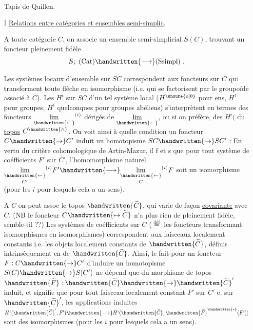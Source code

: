 
Tapis de Quillen.

I \uline{Relations entre catégories et ensembles semi-simplic}.

A toute catégorie $C$, on associe un ensemble semi-simplicial $S(C)$, trouvant  un foncteur pleinement fidèle 
\[
S;\ (\mathrm{Cat})\handwritten{\longrightarrow}(\mathrm{Ssimpl})\ .
\]

 Les systèmes locaux d'ensemble sur $SC$ correspondent aux foncteurs sur $C$ qui transforment toute flêche en isomorphisme (i.e. qui se factorisent par le groupoïde associé à $C$). Les $H^i$ sur $SC$ d'un tel système local ($H^{\unsure{o|0}}$ pour ens, $H^1$ pour groupes, $H^i$ quelconques pour groupes abéliens) s'interprètent en termes des foncteurs $\underset{\handwritten{\leftarrow}}{\mathrm{lim}}^{(i)}$ dérigés de $\underset{\handwritten{\leftarrow}}{\mathrm{lim}}$, ou si on préfère, des $H^i($ du \uline{topos} $C^{\handwritten{\wedge}}$. On voit ainsi à quelle condition un foncteur $C\handwritten{\to}C'$ induit un homotopisme $SC\handwritten{\to}SC'$ : En vertu du critère cohomologique de Artin-Mazur, il f et s que pour tout système de coéfficients $F'$ sur $C'$, l'homomorphisme naturel $\underset{C'}{\underset{\handwritten{\leftarrow}}{\mathrm{lim}}}^{(i)}F'\handwritten{\longrightarrow}\underset{C}{\underset{\handwritten{\leftarrow}}{\mathrm{lim}}}^{(i)}F$ soit un isomorphisme (pour les $i$ pour lesquels cela a un sens). 

A $C$ on peut assoc le topos $\handwritten{\widetilde{C}}$, qui varie de façon \uline{covariante} avec $C$. (NB le foncteur $C\handwritten{\mapsto\widetilde{C}}$ n'a plus rien de pleinement fidèle, semble-til ??) Les systèmes de coéfficients  sur $C$ ($\overset{\mathrm{déf}}{=}$ les foncteurs  transformant isomorphismes en isomorphismes) correspondent aux faisceaux localement constants i.e. les objets localement constants de $\handwritten{\widetilde{C}}$, définis intrinsèquement en  de $\handwritten{\widetilde{C}}$. Ainsi, le fait pour un foncteur $F:C\handwritten{\to}C'$ d'induire un homotopisme $S(C)\handwritten{\to}S(C')$ ne dépend que du morphisme de topos $\handwritten{\widetilde{F}}:\handwritten{\widetilde{C}}\handwritten{\to}\handwritten{\widetilde{C}}'$ induit, et signifie que pour tout faisceau localement constant $F'$ sur $C'$ e. sur $\handwritten{\widetilde{C}}'$, les applications induites $H^i(\handwritten{\widetilde{C}}',F')\handwritten{\longrightarrow}H^i(\handwritten{\widetilde{C}},\handwritten{\widetilde{F}}^{\handwritten{*}}(F'))$ sont des isomorphismes (pour les $i$ pour lesquels cela a un sens).

